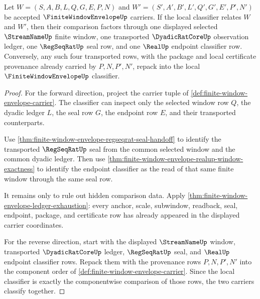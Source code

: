 \begin{theorem}
\label{thm:finite-window-envelope-common-refinement-exactness}
Let $W=(S,A,B,L,Q,G,E,P,N)$ and $W'=(S',A',B',L',Q',G',E',P',N')$ be accepted $\FiniteWindowEnvelopeUp$ carriers. If the local classifier relates $W$ and $W'$, then their comparison factors through one displayed selected $\StreamNameUp$ finite window, one transported $\DyadicRatCoreUp$ observation ledger, one $\RegSeqRatUp$ seal row, and one $\RealUp$ endpoint classifier row. Conversely, any such four transported rows, with the package and local certificate provenance already carried by $P,N,P',N'$, repack into the local $\FiniteWindowEnvelopeUp$ classifier.
\end{theorem}
\begin{proof}
For the forward direction, project the carrier tuple of \autoref{def:finite-window-envelope-carrier}. The classifier can inspect only the selected window row $Q$, the dyadic ledger $L$, the seal row $G$, the endpoint row $E$, and their transported counterparts.

Use \autoref{thm:finite-window-envelope-regseqrat-seal-handoff} to identify the transported $\RegSeqRatUp$ seal from the common selected window and the common dyadic ledger. Then use \autoref{thm:finite-window-envelope-realup-window-exactness} to identify the endpoint classifier as the read of that same finite window through the same seal row.

It remains only to rule out hidden comparison data. Apply \autoref{thm:finite-window-envelope-ledger-exhaustion}: every anchor, scale, subwindow, readback, seal, endpoint, package, and certificate row has already appeared in the displayed carrier coordinates.

For the reverse direction, start with the displayed $\StreamNameUp$ window, transported $\DyadicRatCoreUp$ ledger, $\RegSeqRatUp$ seal, and $\RealUp$ endpoint classifier rows. Repack them with the provenance rows $P,N,P',N'$ into the component order of \autoref{def:finite-window-envelope-carrier}. Since the local classifier is exactly the componentwise comparison of those rows, the two carriers classify together.
\end{proof}

